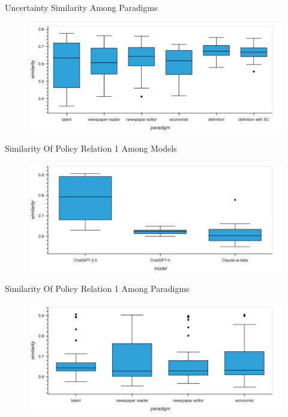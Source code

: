 \documentclass[12pt]{beamer}
\begin{document}
\begin{frame}{Uncertainty Similarity Among Paradigms}
\begin{figure}[H]
\centering
\includegraphics[width=11.5cm]{Figures/fig26.png}
\end{figure}
\end{frame}


\begin{frame}{Similarity Of Policy Relation 1 Among Models}
\begin{figure}[H]
\centering
\includegraphics[width=11.5cm]{Figures/fig27.png}
\end{figure}
\end{frame}


\begin{frame}{Similarity Of Policy Relation 1 Among Paradigms}
\begin{figure}[H]
\centering
\includegraphics[width=11.5cm]{Figures/fig28.png}
\end{figure}
\end{frame}
\end{document}
